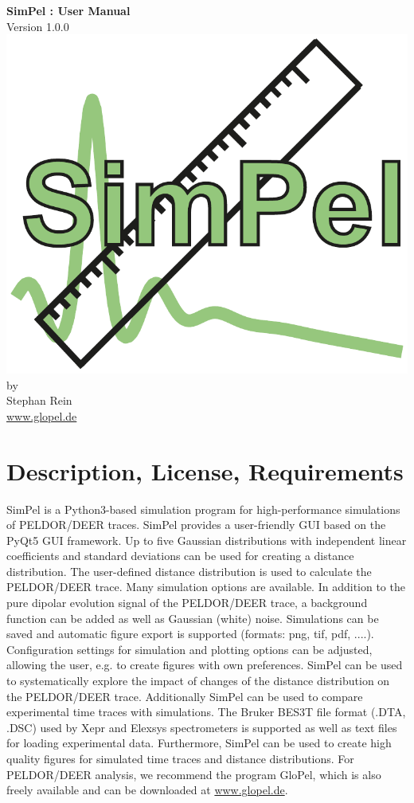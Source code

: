 \documentclass[pdftex,bezier,german,a4,twoside, headexclude,12pt,nochapterprefix, titlepage]{extarticle}
\newcommand{\simpel}{\textsf{SimPel}}
\begin{document}
\thispagestyle{empty}
\begin{center}
\textbf{\Large \simpel{} : User Manual}\\[1.5cm]
{\large Version 1.0.0} \\[1.5cm]
\includegraphics[scale=0.65]{SimPel_Logo.pdf}\\[2cm]
by \\[0.5cm]
{\Large Stephan Rein}\\[1cm]
{\large \url{www.glopel.de}}
\end{center}
\newpage


\section{Description, License, Requirements}
\simpel{} is a Python3-based simulation program for high-performance simulations of PELDOR/DEER traces. \simpel{} provides a user-friendly GUI based on the PyQt5 GUI framework.
Up to five Gaussian distributions with independent
linear coefficients and standard deviations can be used for creating a distance distribution. The user-defined distance distribution
is used to calculate the PELDOR/DEER trace. Many simulation options are available. In addition to the pure dipolar evolution signal of the PELDOR/DEER trace, a background function
can be added as well as Gaussian (white) noise. Simulations can be saved and automatic figure export is supported (formats: png, tif, pdf, ....).
Configuration settings for simulation and plotting options can be adjusted, allowing the user, e.g. to create figures with own preferences.
\simpel{} can be used to systematically explore the impact of changes of the distance distribution on the PELDOR/DEER trace.
Additionally \simpel{} can be used to compare experimental time traces with simulations.
The Bruker BES3T file format (.DTA, .DSC) used by Xepr and Elexsys spectrometers
is supported as well as text files for loading experimental data. Furthermore, \simpel{} can be used to create high quality figures for 
simulated time traces and distance distributions.
For PELDOR/DEER analysis, we recommend the program GloPel, which is also freely available and can be downloaded at {\url{www.glopel.de}}.
\end{document}
